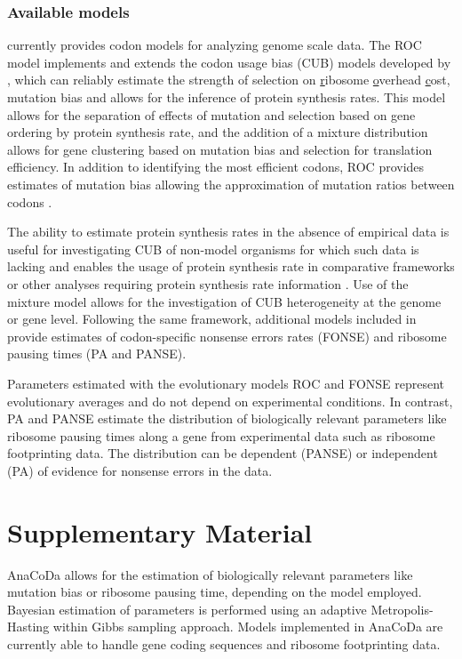 \subsubsection{Available models}
\package currently provides codon models for analyzing genome scale data.
The ROC model implements and extends the codon usage bias (CUB) models developed by \citet{gilchrist2015,wallace2013,shah2011}, which can reliably estimate the strength of selection on \underline{r}ibosome \underline{o}verhead \underline{c}ost, mutation bias and allows for the inference of protein synthesis rates.
This model allows for the separation of effects of mutation and selection based on gene ordering by protein synthesis rate, and the addition of a mixture distribution allows for gene clustering based on mutation bias and selection for translation efficiency.
In addition to identifying the most efficient codons, ROC provides estimates of mutation bias allowing the approximation of mutation ratios between codons \citep{gilchrist2015,wallace2013}.

The ability to estimate protein synthesis rates in the absence of empirical data is useful for investigating CUB of non-model organisms for which such data is lacking and enables the usage of protein synthesis rate in comparative frameworks or other analyses requiring protein synthesis rate information \citep{dunn2018}.
Use of the mixture model allows for the investigation of CUB heterogeneity at the genome or gene level.  
Following the same framework, additional models included in \package provide estimates of codon-specific nonsense errors rates (FONSE) and ribosome pausing times (PA and PANSE).

Parameters estimated with the evolutionary models ROC and FONSE represent evolutionary averages and do not depend on experimental conditions. 
In contrast, PA and PANSE estimate the distribution of biologically relevant parameters like ribosome pausing times along a gene from experimental data such as ribosome footprinting data. 
The distribution can be dependent (PANSE) or independent (PA) of evidence for nonsense errors in the data.  


\section{Supplementary Material}
AnaCoDa allows for the estimation of biologically relevant parameters like mutation bias or ribosome pausing
time, depending on the model employed. Bayesian estimation of parameters is performed using an adaptive
Metropolis-Hasting within Gibbs sampling approach. Models implemented in AnaCoDa are currently able to
handle gene coding sequences and ribosome footprinting data.

